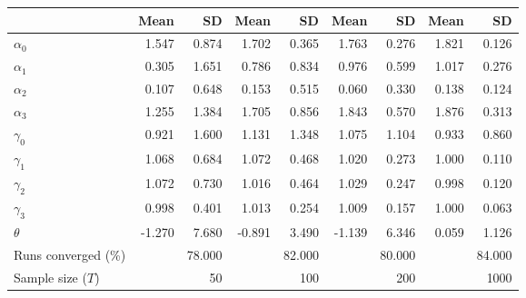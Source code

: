 
\begin{tabular}[t]{lrrrrrrrr}
\toprule
  & Mean & SD & Mean  & SD  & Mean   & SD   & Mean    & SD   \\
\midrule
$\alpha_{0}$ & 1.547 & 0.874 & 1.702 & 0.365 & 1.763 & 0.276 & 1.821 & 0.126\\
$\alpha_{1}$ & 0.305 & 1.651 & 0.786 & 0.834 & 0.976 & 0.599 & 1.017 & 0.276\\
$\alpha_{2}$ & 0.107 & 0.648 & 0.153 & 0.515 & 0.060 & 0.330 & 0.138 & 0.124\\
$\alpha_{3}$ & 1.255 & 1.384 & 1.705 & 0.856 & 1.843 & 0.570 & 1.876 & 0.313\\
$\gamma_{0}$ & 0.921 & 1.600 & 1.131 & 1.348 & 1.075 & 1.104 & 0.933 & 0.860\\
$\gamma_{1}$ & 1.068 & 0.684 & 1.072 & 0.468 & 1.020 & 0.273 & 1.000 & 0.110\\
$\gamma_{2}$ & 1.072 & 0.730 & 1.016 & 0.464 & 1.029 & 0.247 & 0.998 & 0.120\\
$\gamma_{3}$ & 0.998 & 0.401 & 1.013 & 0.254 & 1.009 & 0.157 & 1.000 & 0.063\\
$\theta$ & -1.270 & 7.680 & -0.891 & 3.490 & -1.139 & 6.346 & 0.059 & 1.126\\
Runs converged (\%) &  & 78.000 &  & 82.000 &  & 80.000 &  & 84.000\\
Sample size ($T$) &  & 50 &  & 100 &  & 200 &  & 1000\\
\bottomrule
\end{tabular}
